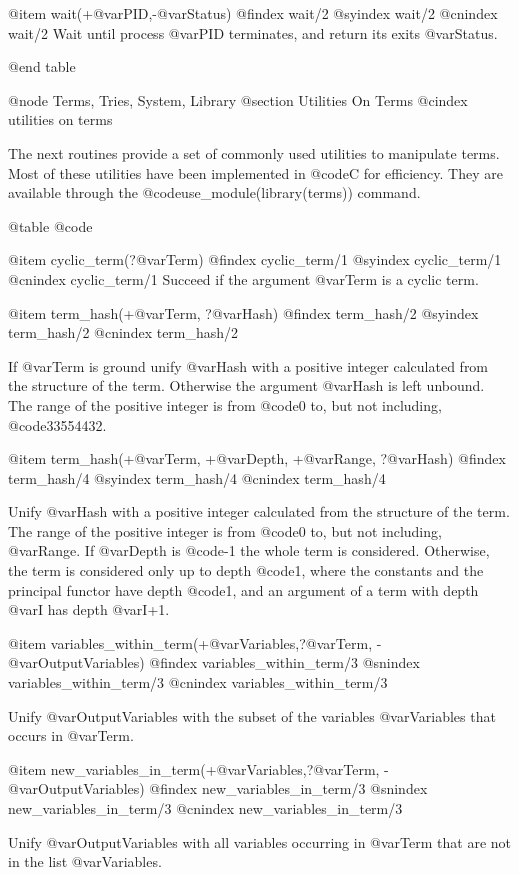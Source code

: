 {{{{{{{{{@item wait(+@var{PID},-@var{Status})
@findex  wait/2
@syindex wait/2
@cnindex wait/2
Wait until process @var{PID} terminates, and return its exits @var{Status}.

@end table


@node Terms, Tries, System, Library
@section Utilities On Terms
@cindex utilities on terms

The next routines provide a set of commonly used utilities to manipulate
terms. Most of these utilities have been implemented in @code{C} for
efficiency. They are available through the
@code{use_module(library(terms))} command.

@table @code

@item cyclic_term(?@var{Term})
@findex cyclic_term/1
@syindex cyclic_term/1
@cnindex cyclic_term/1
Succeed if the argument @var{Term} is a cyclic term.

@item term_hash(+@var{Term}, ?@var{Hash})
@findex  term_hash/2
@syindex term_hash/2
@cnindex term_hash/2

If @var{Term} is ground unify @var{Hash} with a positive integer
calculated from the structure of the term. Otherwise the argument
@var{Hash} is left unbound. The range of the positive integer is from
@code{0} to, but not including, @code{33554432}.

@item term_hash(+@var{Term}, +@var{Depth}, +@var{Range}, ?@var{Hash})
@findex  term_hash/4
@syindex term_hash/4
@cnindex term_hash/4

Unify @var{Hash} with a positive integer calculated from the structure
of the term.  The range of the positive integer is from @code{0} to, but
not including, @var{Range}. If @var{Depth} is @code{-1} the whole term
is considered. Otherwise, the term is considered only up to depth
@code{1}, where the constants and the principal functor have depth
@code{1}, and an argument of a term with depth @var{I} has depth @var{I+1}. 

@item variables_within_term(+@var{Variables},?@var{Term}, -@var{OutputVariables})
@findex  variables_within_term/3
@snindex variables_within_term/3 
@cnindex variables_within_term/3  

Unify @var{OutputVariables} with the subset of the variables @var{Variables} that occurs in @var{Term}.

@item new_variables_in_term(+@var{Variables},?@var{Term}, -@var{OutputVariables})
@findex  new_variables_in_term/3
@snindex new_variables_in_term/3 
@cnindex new_variables_in_term/3  

Unify @var{OutputVariables} with all variables occurring in @var{Term} that are not in the list @var{Variables}.

}}}}}}}}}
